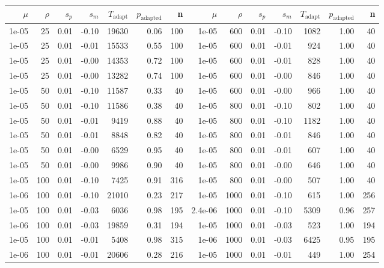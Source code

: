 \begin{table}[ht]
\centering
{\tiny
\begin{tabular}{|rrrrrrr||rrrrrrr|}
  \hline
$\mu$ & $\rho$ & $s_p$ & $s_m$ & $T_\text{adapt}$ & $p_\text{adapted}$ & n & $\mu$ & $\rho$ & $s_p$ & $s_m$ & $T_\text{adapt}$ & $p_\text{adapted}$ & n \\ 
  \hline
1e-05 & 25 & 0.01 & -0.10 & 19630 & 0.06 & 100 & 1e-05 & 600 & 0.01 & -0.10 & 1082 & 1.00 & 40 \\ 
  1e-05 & 25 & 0.01 & -0.01 & 15533 & 0.55 & 100 & 1e-05 & 600 & 0.01 & -0.01 & 924 & 1.00 & 40 \\ 
  1e-05 & 25 & 0.01 & -0.00 & 14353 & 0.72 & 100 & 1e-05 & 600 & 0.01 & -0.01 & 828 & 1.00 & 40 \\ 
  1e-05 & 25 & 0.01 & -0.00 & 13282 & 0.74 & 100 & 1e-05 & 600 & 0.01 & -0.00 & 846 & 1.00 & 40 \\ 
  1e-05 & 50 & 0.01 & -0.10 & 11587 & 0.33 & 40 & 1e-05 & 600 & 0.01 & -0.00 & 966 & 1.00 & 40 \\ 
  1e-05 & 50 & 0.01 & -0.10 & 11586 & 0.38 & 40 & 1e-05 & 800 & 0.01 & -0.10 & 802 & 1.00 & 40 \\ 
  1e-05 & 50 & 0.01 & -0.01 & 9419 & 0.88 & 40 & 1e-05 & 800 & 0.01 & -0.10 & 1182 & 1.00 & 40 \\ 
  1e-05 & 50 & 0.01 & -0.01 & 8848 & 0.82 & 40 & 1e-05 & 800 & 0.01 & -0.01 & 846 & 1.00 & 40 \\ 
  1e-05 & 50 & 0.01 & -0.00 & 6529 & 0.95 & 40 & 1e-05 & 800 & 0.01 & -0.01 & 607 & 1.00 & 40 \\ 
  1e-05 & 50 & 0.01 & -0.00 & 9986 & 0.90 & 40 & 1e-05 & 800 & 0.01 & -0.00 & 646 & 1.00 & 40 \\ 
  1e-05 & 100 & 0.01 & -0.10 & 7425 & 0.91 & 316 & 1e-05 & 800 & 0.01 & -0.00 & 507 & 1.00 & 40 \\ 
  1e-06 & 100 & 0.01 & -0.10 & 21010 & 0.23 & 217 & 1e-05 & 1000 & 0.01 & -0.10 & 615 & 1.00 & 256 \\ 
  1e-05 & 100 & 0.01 & -0.03 & 6036 & 0.98 & 195 & 2.4e-06 & 1000 & 0.01 & -0.10 & 5309 & 0.96 & 257 \\ 
  1e-06 & 100 & 0.01 & -0.03 & 19859 & 0.31 & 194 & 1e-05 & 1000 & 0.01 & -0.03 & 523 & 1.00 & 194 \\ 
  1e-05 & 100 & 0.01 & -0.01 & 5408 & 0.98 & 315 & 1e-06 & 1000 & 0.01 & -0.03 & 6425 & 0.95 & 195 \\ 
  1e-06 & 100 & 0.01 & -0.01 & 20606 & 0.28 & 216 & 1e-05 & 1000 & 0.01 & -0.01 & 449 & 1.00 & 254 \\ 

\end{tabular}}
\end{table}
